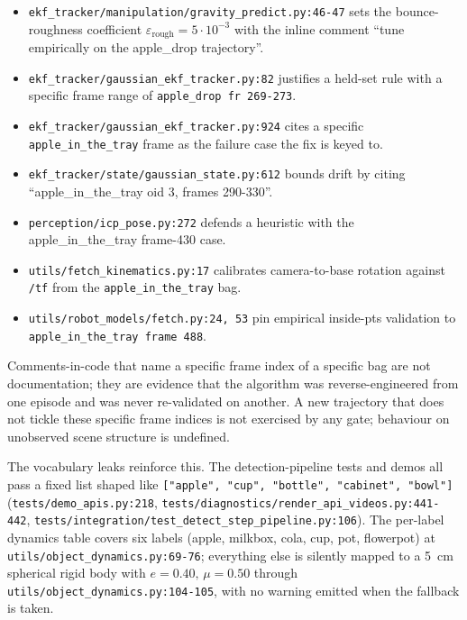 \documentclass[11pt]{article}
\begin{document}
\begin{itemize}[leftmargin=1.5em,itemsep=0pt,topsep=2pt]
\item \texttt{ekf\_tracker/manipulation/gravity\_predict.py:46-47} sets the
  bounce-roughness coefficient $\varepsilon_{\text{rough}}=5\!\cdot\!10^{-3}$
  with the inline comment ``tune empirically on the apple\_drop trajectory''.
\item \texttt{ekf\_tracker/gaussian\_ekf\_tracker.py:82} justifies a held-set
  rule with a specific frame range of \texttt{apple\_drop fr 269-273}.
\item \texttt{ekf\_tracker/gaussian\_ekf\_tracker.py:924} cites a specific
  \texttt{apple\_in\_the\_tray} frame as the failure case the fix is keyed to.
\item \texttt{ekf\_tracker/state/gaussian\_state.py:612} bounds drift by
  citing ``apple\_in\_the\_tray oid 3, frames 290-330''.
\item \texttt{perception/icp\_pose.py:272} defends a heuristic with the
  apple\_in\_the\_tray frame-430 case.
\item \texttt{utils/fetch\_kinematics.py:17} calibrates camera-to-base
  rotation against \texttt{/tf} from the \texttt{apple\_in\_the\_tray} bag.
\item \texttt{utils/robot\_models/fetch.py:24, 53} pin empirical inside-pts
  validation to \texttt{apple\_in\_the\_tray frame 488}.
\end{itemize}

Comments-in-code that name a specific frame index of a specific bag are not
documentation; they are evidence that the algorithm was reverse-engineered
from one episode and was never re-validated on another. A new trajectory
that does not tickle these specific frame indices is not exercised by any
gate; behaviour on unobserved scene structure is undefined.

The vocabulary leaks reinforce this. The detection-pipeline tests and
demos all pass a fixed list shaped like
\texttt{["apple", "cup", "bottle", "cabinet", "bowl"]}
(\texttt{tests/demo\_apis.py:218}, \texttt{tests/diagnostics/render\_api\_videos.py:441-442},
\texttt{tests/integration/test\_detect\_step\_pipeline.py:106}). The
per-label dynamics table covers six labels (apple, milkbox, cola, cup, pot,
flowerpot) at \texttt{utils/object\_dynamics.py:69-76}; everything else is
silently mapped to a 5~cm spherical rigid body with $e{=}0.40,\,\mu{=}0.50$
through \texttt{utils/object\_dynamics.py:104-105}, with no warning emitted
when the fallback is taken.
\end{document}
